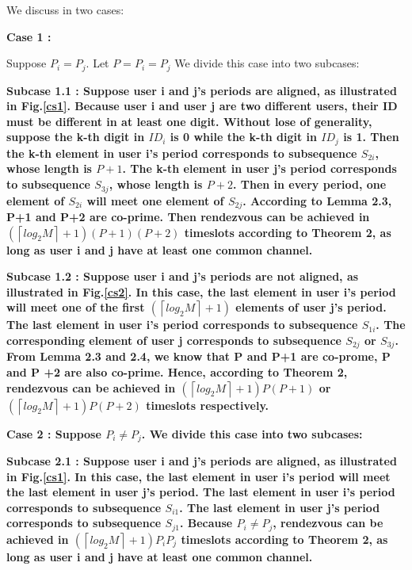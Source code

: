 \documentclass[10pt, conference, letterpaper]{IEEEtran}
\begin{document}
\begin{IEEEproof}
We discuss in two cases:

\bfseries Case 1 \mdseries:

 Suppose $P_i = P_j$. Let $P = P_i =P_j$ We divide this case into two subcases:

\bfseries Subcase 1.1 \mdseries: Suppose user i and j's periods are aligned, as illustrated in Fig.\ref{cs1}. Because user i and user j are two different users, their ID must be different in at least one digit. Without lose of generality, suppose the k-th digit in $ID_i$ is 0 while the k-th digit in $ID_j$ is 1. Then the k-th element in user i's period corresponds to subsequence $S_{2i}$, whose length is $P+1$. The k-th element in user j's period corresponds to subsequence $S_{3j}$, whose length is $P+2$. Then in every period, one element of $S_{2i}$ will meet one element of $S_{2j}$. According to Lemma 2.3, P+1 and P+2 are co-prime. Then rendezvous can be achieved in $(\left \lceil log_2M \right \rceil + 1)(P+1)(P+2)$ timeslots according to Theorem 2, as long as user i and j have at least one common channel.

\bfseries Subcase 1.2 \mdseries: Suppose user i and j's periods are not aligned, as illustrated in Fig.\ref{cs2}. In this case, the last element in user i's period will meet one of the first $(\left \lceil log_2M \right \rceil + 1)$ elements of user j's period. The last element in user i's period corresponds to subsequence $S_{1i}$. The corresponding element of user j corresponds to subsequence $S_{2j}$ or $S_{3j}$. From Lemma 2.3 and 2.4, we know that P and P+1 are co-prome, P and P +2 are also co-prime. Hence, according to Theorem 2, rendezvous can be achieved in $(\left \lceil log_2M \right \rceil + 1)P(P+1)$ or $(\left \lceil log_2M \right \rceil + 1)P(P+2)$ timeslots respectively.

\bfseries Case 2 \mdseries: Suppose $P_i \ne P_j$.  We divide this case into two subcases:

\bfseries Subcase 2.1 \mdseries: Suppose user i and j's periods are aligned, as illustrated in Fig.\ref{cs1}. In this case, the last
element in user i's period will meet the last element in user j's period. The last element in user i's period corresponds to subsequence $S_{i1}$. The last element in user j's period corresponds to subsequence $S_{j1}$. Because $P_i \ne P_j$, rendezvous can be achieved in $(\left \lceil log_2M \right \rceil + 1)P_iP_j$ timeslots according to Theorem 2, as long as user i and j have at least one common channel.


\end{IEEEproof}
\end{document}
